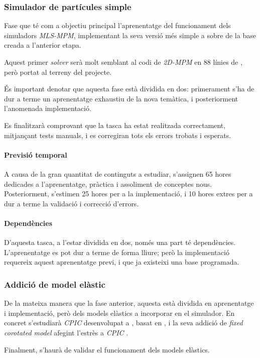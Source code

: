 \documentclass[a4paper]{article} %
\begin{document}
	\subsubsection{Simulador de partícules simple}
	Fase que té com a objectiu principal l'aprenentatge del funcionament dels simuladors \textit{MLS-MPM}, implementant la seva versió més simple a sobre de la base creada a l'anterior etapa. \par 
	Aquest primer \textit{solver} serà molt semblant al codi de \textit{2D-MPM} en 88 línies de \cite{hu2018mlsmpmcpic}, però portat al terreny del projecte.\par 
	És important denotar que aquesta fase està dividida en dos: primerament s'ha de dur a terme un aprenentatge exhaustiu de la nova temàtica, i posteriorment l'anomenada implementació. \par 
	Es finalitzarà comprovant que la tasca ha estat realitzada correctament, mitjançant tests manuals, i es corregiran tots els errors trobats i esperats.
	\paragraph{\quad Previsió temporal} A causa de la gran quantitat de continguts a estudiar, s'assignen 65 hores dedicades a l'aprenentatge, pràctica i assoliment de conceptes nous. Posteriorment, s'estimen 25 hores per a la implementació, i 10 hores extres per a dur a terme la validació i correcció d'errors.
	\paragraph{\quad Dependències} D'aquesta tasca, a l'estar dividida en dos, només una part té dependències. L'aprenentatge es pot dur a terme de forma lliure; però la implementació requereix aquest aprenentatge previ, i que ja existeixi una base programada.
	
	\subsubsection{Addició de model elàstic}
	De la mateixa manera que la fase anterior, aquesta està dividida en aprenentatge i implementació, però dels models elàstics a incorporar en el simulador. En concret s'estudiarà \textit{CPIC} desenvolupat a \cite{hu2018mlsmpmcpic}, basat en \cite{Jiang2016}, i la seva addició de \textit{fixed corotated model} afegint l'estrès a \textit{CPIC} \cite{Hu,Jiang2016}. \par
	Finalment, s'haurà de validar el funcionament dels models elàstics.
\end{document}

